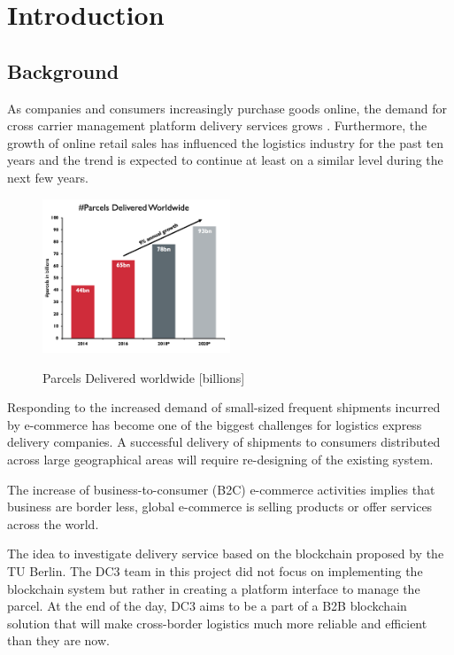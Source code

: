 \chapter{Introduction}
\label{cha:introduction}

\section{Background}

As companies and consumers increasingly purchase goods online, the demand for cross carrier management platform
delivery services grows . Furthermore, the growth of online retail
sales has influenced the logistics industry for the past ten years and the trend is expected to
continue at least on a similar level during the next few years. 

\begin{figure}[!ht]
	\centering
	\includegraphics[width=0.5\textwidth]{images/ParcelsDel.png}\\
	\caption{Parcels Delivered worldwide [billions]}
	\label{fig:introduction__loremipsum}
\end{figure}

Responding to the increased demand of small-sized frequent shipments incurred by e-commerce has become one of the biggest challenges for logistics express delivery companies.
A successful delivery of shipments to consumers distributed across large geographical areas
will require re-designing of the existing system.

The increase of business-to-consumer (B2C) e-commerce activities implies that business are border less, global e-commerce is selling products or offer services across the world.


The idea to investigate delivery service based on the  blockchain proposed by the TU Berlin. The DC3 team in this project did not focus on implementing the blockchain system but rather in creating a platform interface to manage the parcel. At the end of the day, DC3 aims to be a part of a B2B blockchain solution that will make cross-border logistics much more reliable and efficient than they are now.   

